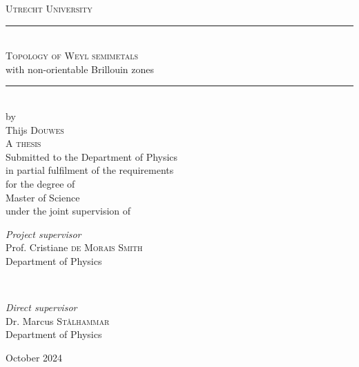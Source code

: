 \documentclass[12pt,a4paper]{report}
\theoremstyle{definition}
\theoremstyle{remark}
\newcommand{\?}{\stackrel{?}{=}}
\begin{document}
	
\begin{titlepage}  %
	\center
	
	\textsc{\LARGE Utrecht University}\\[1.5cm]  %
	
	
	\rule{\linewidth}{0.5mm}\\[0.4cm]
	
	{\Huge\textsc{Topology of Weyl semimetals}\\[.2cm] \huge  with non-orientable Brillouin zones}\\[0.4cm] %
	
	\rule{\linewidth}{0.5mm}\\[.8cm]
	
	
	{\large by}\\[.8cm]
	
	
	{\LARGE Thijs \textsc{Douwes}}\\[1.1cm]
	
	
	
	{\Large \textsc{A thesis}}\\[.8cm]
	
	
	{\large Submitted to the Department of Physics}\\[.1cm]
	{\large in partial fulfilment of the requirements}\\[.1cm]
	{\large for the degree of}\\[.5cm]
	
	{\Large Master of Science}\\[.9cm]
	
	
	{\large under the joint supervision of}\\[1cm]
	
	
	\begin{minipage}{0.45\textwidth}
		\begin{flushleft}
			\large
			\textit{Project supervisor}\\
			Prof. Cristiane \textsc{de Morais Smith}\\
			\normalsize Department of Physics
		\end{flushleft}
	\end{minipage}
	~
	\begin{minipage}{0.45\textwidth}
		\begin{flushright}
			\large
			\textit{Direct supervisor}\\
			Dr. Marcus \textsc{St{\aa}lhammar}\\
			\normalsize Department of Physics
		\end{flushright}
	\end{minipage}
	
	
	\vfill\vfill\vfill  %
	
	{\large October 2024}  %
	
	\vfill  %
\end{titlepage}
\setcounter{page}{2}  %
	
\end{document}
